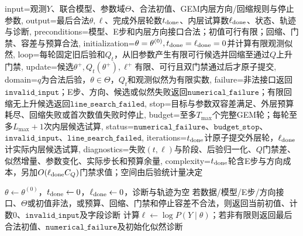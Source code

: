 \begin{AlgorithmContract}{
  input={观测$Y$、联合模型、参数域$\Theta$、合法初值、GEM内层方向/回缩规则与停止参数},
  output={最后合法$\theta,\ell$、完成外层轮数$t_{\rm done}$、内层试算数$\ell_{\rm done}$、状态、轨迹与诊断},
  preconditions={模型、E步和内层方向接口合法；初值可行有限；回缩、门禁、容差与预算合法},
  initialization={$\theta=\theta^{(0)},t_{\rm done}=\ell_{\rm done}=0$并计算有限观测似然},
  loop={每轮固定旧后验和$Q_t$，从旧参数产生有限可行候选并回缩至通过$Q$上升门禁},
  update={候选$\theta^+,Q_t(\theta^+),\ell^+$有限、可行且双门禁通过后才原子提交},
  domain={$q$为合法后验，$\theta\in\Theta$，$Q_t$和观测似然为有限实数},
  failure={非法接口返回$\mathtt{invalid\_input}$；E步、方向、候选或似然失败返回$\mathtt{numerical\_failure}$；有限回缩无上升候选返回$\mathtt{line\_search\_failed}$},
  stop={目标与参数双容差满足、外层预算耗尽、回缩失败或首次数值失败时停止},
  budget={至多$T_{\max}$个完整GEM轮；每轮至多$L_{\max}+1$次内层候选试算},
  status={$\mathtt{numerical\_failure}$、$\mathtt{budget\_stop}$、$\mathtt{invalid\_input}$、$\mathtt{line\_search\_failed}$},
  iterations={$t_{\rm done}$计原子提交外层轮，$\ell_{\rm done}$计实际内层候选试算},
  diagnostics={失败$(t,\ell)$与阶段、后验归一化、$Q$门禁差、似然增量、参数变化、实际步长和预算余量},
  complexity={$t_{\rm done}$轮含E步与方向成本，另加$O(\ell_{\rm done}C_Q)$门禁求值；空间由后验统计量决定}
}
\begin{algorithm}[H]
\caption{以$Q$上升为门禁的GEM}\label{alg:V3-C04-gem-q}
$\theta\leftarrow\theta^{(0)}$，$t_{\rm done}\leftarrow0$，$\ell_{\rm done}\leftarrow0$，诊断与轨迹为空\;
若数据/模型/E步/方向接口、$\Theta$或初值非法，或预算、回缩、门禁和停止容差不合法，则返回当前初值、计数$0$、$\mathtt{invalid\_input}$及字段诊断\;
计算$\ell\leftarrow\log P(Y\mid\theta)$；若非有限则返回最后合法初值、$\mathtt{numerical\_failure}$及初始化似然诊断\;
\end{algorithm}
\end{AlgorithmContract}

